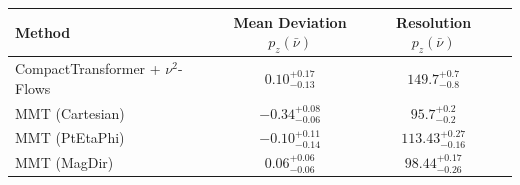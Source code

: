     \begin{tabular}{lccc}
        \toprule
        Method & Mean Deviation $p_{z}(\bar{\nu})$ & Resolution $p_{z}(\bar{\nu})$ \\
        \midrule
        CompactTransformer + $\nu^2$-Flows & $0.10^{+0.17}_{-0.13}$ & $149.7^{+0.7}_{-0.8}$ \\
        MMT (Cartesian) & $-0.34^{+0.08}_{-0.06}$ & $95.7^{+0.2}_{-0.2}$ \\
        MMT (PtEtaPhi) & $-0.10^{+0.11}_{-0.14}$ & $113.43^{+0.27}_{-0.16}$ \\
        MMT (MagDir) & $0.06^{+0.06}_{-0.06}$ & $98.44^{+0.17}_{-0.26}$ \\
        \bottomrule
    \end{tabular}